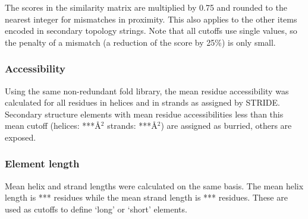 \documentclass{article}
\begin{document}

The scores in the similarity matrix are multiplied by 0.75 and rounded
to the nearest integer for mismatches in proximity. This also applies
to the other items encoded in secondary topology strings. Note that
all cutoffs use single values, so the penalty of a mismatch (a
reduction of the score by 25\%) is only small.


\subsubsection{Accessibility}
Using the same non-redundant fold library, the mean residue
accessibility was calculated for all residues in helices and in
strands as assigned by STRIDE. Secondary structure elements with mean
residue accessibilities less than this mean cutoff (helices:
***\AA${}^{2}$ strands: ***\AA${}^2$) are assigned as burried, others
are exposed.

\subsubsection{Element length}
Mean helix and strand lengths were calculated on the same basis. The
mean helix length is *** residues while the mean strand length is ***
residues. These are used as cutoffs to define `long' or `short' elements.
\end{document}
